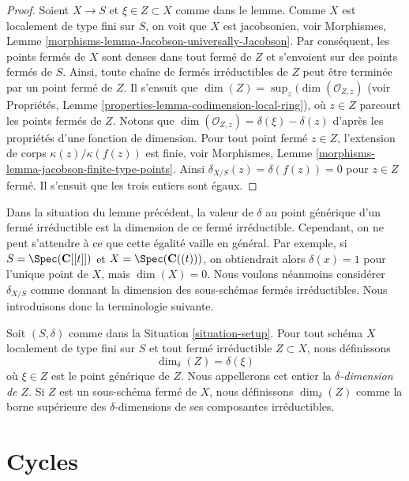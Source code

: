 \begin{proof}
Soient $X \to S$ et $\xi \in Z \subset X$ comme dans le lemme.
Comme $X$ est localement de type fini sur $S$, on voit que
$X$ est jacobsonien, voir
Morphismes, Lemme \ref{morphisms-lemma-Jacobson-universally-Jacobson}.
Par conséquent, les points fermés de $X$ sont denses dans tout fermé de $Z$
et s'envoient sur des points fermés de $S$. Ainsi, toute chaîne
de fermés irréductibles de $Z$ peut être terminée par un point fermé de $Z$.
Il s'ensuit que $\dim(Z) = \sup_z(\dim(\mathcal{O}_{Z, z})$
(voir Propriétés, Lemme \ref{properties-lemma-codimension-local-ring}),
où $z \in Z$ parcourt les points fermés de $Z$.
Notons que $\dim(\mathcal{O}_{Z, z}) = \delta(\xi) - \delta(z)$
d'après les propriétés d'une fonction de dimension.
Pour tout point fermé $z \in Z$, l'extension de corps
$\kappa(z)/\kappa(f(z))$ est finie, voir Morphismes,
Lemme \ref{morphisms-lemma-jacobson-finite-type-points}.
Ainsi $\delta_{X/S}(z) = \delta(f(z)) = 0$ pour $z \in Z$ fermé.
Il s'ensuit que les trois entiers sont égaux.
\end{proof}

\noindent
Dans la situation du lemme précédent, la
valeur de $\delta$ au point générique d'un fermé irréductible
est la dimension de ce fermé irréductible.
Cependant, on ne peut s'attendre à ce que cette égalité vaille en général.
Par exemple, si $S = \Spec(\mathbf{C}[[t]])$ et
$X = \Spec(\mathbf{C}((t)))$, on obtiendrait alors
$\delta(x) = 1$ pour l'unique point de $X$, mais $\dim(X) = 0$.
Nous voulons néanmoins considérer $\delta_{X/S}$ comme donnant la
dimension des sous-schémas fermés irréductibles. Nous introduisons donc
la terminologie suivante.

\begin{definition}
\label{definition-delta-dimension}
Soit $(S, \delta)$ comme dans la Situation \ref{situation-setup}.
Pour tout schéma $X$ localement de type fini sur $S$
et tout fermé irréductible $Z \subset X$, nous définissons
$$
\dim_\delta(Z) = \delta(\xi)
$$
où $\xi \in Z$ est le point générique de $Z$.
Nous appellerons cet entier la {\it $\delta$-dimension de $Z$}.
Si $Z$ est un sous-schéma fermé de $X$, nous définissons
$\dim_\delta(Z)$ comme la borne supérieure des $\delta$-dimensions
de ses composantes irréductibles.
\end{definition}







\section{Cycles}
\label{section-cycles}

